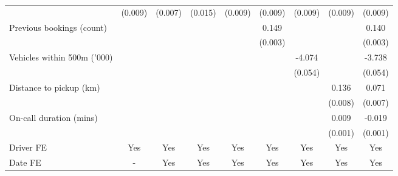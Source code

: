 {\begin{tabular}{l*{8}{S}}
                    &     (0.009)         &     (0.007)         &     (0.015)         &     (0.009)         &     (0.009)         &     (0.009)         &     (0.009)         &     (0.009)         \\
\addlinespace
Previous bookings (count)&                     &                     &                     &                     &       0.149\sym{***}&                     &                     &       0.140\sym{***}\\
                    &                     &                     &                     &                     &     (0.003)         &                     &                     &     (0.003)         \\
\addlinespace
Vehicles within 500m ('000)&                     &                     &                     &                     &                     &      -4.074\sym{***}&                     &      -3.738\sym{***}\\
                    &                     &                     &                     &                     &                     &     (0.054)         &                     &     (0.054)         \\
\addlinespace
Distance to pickup (km)&                     &                     &                     &                     &                     &                     &       0.136\sym{***}&       0.071\sym{***}\\
                    &                     &                     &                     &                     &                     &                     &     (0.008)         &     (0.007)         \\
\addlinespace
On-call duration (mins)&                     &                     &                     &                     &                     &                     &       0.009\sym{***}&      -0.019\sym{***}\\
                    &                     &                     &                     &                     &                     &                     &     (0.001)         &     (0.001)         \\
\addlinespace
Driver FE           &       {Yes}         &       {Yes}         &       {Yes}         &       {Yes}         &       {Yes}         &       {Yes}         &       {Yes}         &       {Yes}         \\
\addlinespace
Date FE           &       {-}         &       {Yes}         &       {Yes}         &       {Yes}         &       {Yes}         &       {Yes}         &       {Yes}         &       {Yes}         \\

\end{tabular}}
